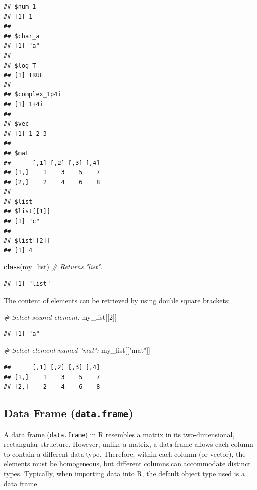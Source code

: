 \documentclass[
]{book}
\newenvironment{Shaded}{\begin{snugshade}}{\end{snugshade}}
\newcommand{\CommentTok}[1]{\textcolor[rgb]{0.56,0.35,0.01}{\textit{#1}}}
\newcommand{\DecValTok}[1]{\textcolor[rgb]{0.00,0.00,0.81}{#1}}
\newcommand{\FunctionTok}[1]{\textcolor[rgb]{0.13,0.29,0.53}{\textbf{#1}}}
\newcommand{\NormalTok}[1]{#1}
\newcommand{\StringTok}[1]{\textcolor[rgb]{0.31,0.60,0.02}{#1}}
\begin{document}
\begin{verbatim}
## $num_1
## [1] 1
## 
## $char_a
## [1] "a"
## 
## $log_T
## [1] TRUE
## 
## $complex_1p4i
## [1] 1+4i
## 
## $vec
## [1] 1 2 3
## 
## $mat
##      [,1] [,2] [,3] [,4]
## [1,]    1    3    5    7
## [2,]    2    4    6    8
## 
## $list
## $list[[1]]
## [1] "c"
## 
## $list[[2]]
## [1] 4
\end{verbatim}

\begin{Shaded}
\begin{Highlighting}[]
\FunctionTok{class}\NormalTok{(my\_list)  }\CommentTok{\# Returns "list".}
\end{Highlighting}
\end{Shaded}

\begin{verbatim}
## [1] "list"
\end{verbatim}

The content of elements can be retrieved by using double square brackets:

\begin{Shaded}
\begin{Highlighting}[]
\CommentTok{\# Select second element:}
\NormalTok{my\_list[[}\DecValTok{2}\NormalTok{]]}
\end{Highlighting}
\end{Shaded}

\begin{verbatim}
## [1] "a"
\end{verbatim}

\begin{Shaded}
\begin{Highlighting}[]
\CommentTok{\# Select element named "mat":}
\NormalTok{my\_list[[}\StringTok{"mat"}\NormalTok{]]}
\end{Highlighting}
\end{Shaded}

\begin{verbatim}
##      [,1] [,2] [,3] [,4]
## [1,]    1    3    5    7
## [2,]    2    4    6    8
\end{verbatim}

\hypertarget{data-frame-data.frame}{%
\subsection{\texorpdfstring{Data Frame (\texttt{data.frame})}{Data Frame (data.frame)}}\label{data-frame-data.frame}}

A data frame (\texttt{data.frame}) in R resembles a matrix in its two-dimensional, rectangular structure. However, unlike a matrix, a data frame allows each column to contain a different data type. Therefore, within each column (or vector), the elements must be homogeneous, but different columns can accommodate distinct types. Typically, when importing data into R, the default object type used is a data frame.
\end{document}
